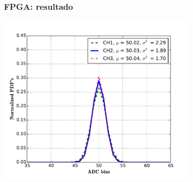 \documentclass{beamer}
\begin{document}
\begin{frame}
  \frametitle{FPGA: resultado}
  \begin{block}{}
    \centering
    \includegraphics[height=0.55\textheight,width=0.75\textwidth]{d5/histogramas_por_canal_normal}
  \end{block}
\end{frame}
\end{document}
